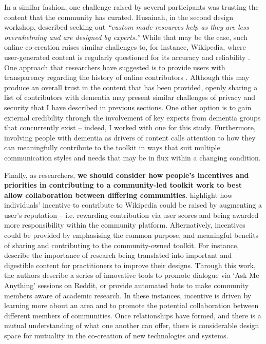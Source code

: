 In a similar fashion, one challenge raised by several participants was trusting the content that the community has curated. Husainah, in the second design workshop, described seeking out \textit{``custom made resources help as they are less overwhelming and are designed by experts.''} While that may be the case, such online co-creation raises similar challenges to, for instance, Wikipedia, where user-generated content is regularly questioned for its accuracy and reliability  \citep{kittur2008can}. One approach that researchers have suggested is to provide users with transparency regarding the history of online contributors \citep{heuer2018trust}. Although this may produce an overall trust in the content that has been provided, openly sharing a list of contributors with dementia may present similar challenges of privacy and security that I have described in previous sections. One other option is to gain external credibility through the involvement of key experts from dementia groups that concurrently exist – indeed, I worked with one for this study. Furthermore, involving people with dementia as drivers of content calls attention to how they can meaningfully contribute to the toolkit in ways that suit multiple communication styles and needs that may be in flux within a changing condition.

Finally, as researchers, \textbf{we should consider how people’s incentives and priorities in contributing to a community-led toolkit work to best allow collaboration between differing communities}. \cite{borges2008towards} highlight how individuals’ incentive to contribute to Wikipedia could be raised by augmenting a user’s reputation – i.e. rewarding contribution via user scores and being awarded more responsibility within the community platform. Alternatively, incentives could be provided by emphasising the common purpose, and meaningful benefits of sharing and contributing to the community-owned toolkit. For instance, \cite{colusso2017translational} describe the importance of research being translated into important and digestible content for practitioners to improve their designs. Through this work, the authors describe a series of innovative tools to promote dialogue via ‘Ask Me Anything’ sessions on Reddit, or provide automated bots to make community members aware of academic research.  In these instances, incentive is driven by learning more about an area and to promote the potential collaboration between different members of communities. Once relationships have formed, and there is a mutual understanding of what one another can offer, there is considerable design space for mutuality in the co-creation of new technologies and systems.

